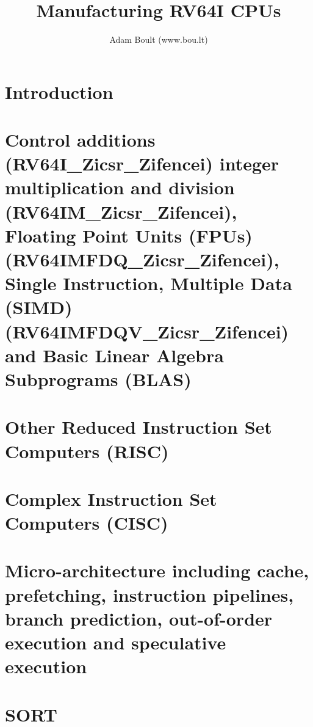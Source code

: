 \documentclass[oneside]{book}
\begin{document}
\author{Adam Boult (www.bou.lt)}
\title{Manufacturing RV64I CPUs}
\maketitle

\setcounter{tocdepth}{0}
\tableofcontents



\part{Introduction}

\part{Control additions (RV64I\_Zicsr\_Zifencei) integer multiplication and division (RV64IM\_Zicsr\_Zifencei), Floating Point Units (FPUs) (RV64IMFDQ\_Zicsr\_Zifencei), Single Instruction, Multiple Data (SIMD) (RV64IMFDQV\_Zicsr\_Zifencei) and Basic Linear Algebra Subprograms (BLAS)}

\part{Other Reduced Instruction Set Computers (RISC)}








\part{Complex Instruction Set Computers (CISC)}







\part{Micro-architecture including cache, prefetching, instruction pipelines, branch prediction, out-of-order execution and speculative execution}

\part{SORT}

\end{document}
